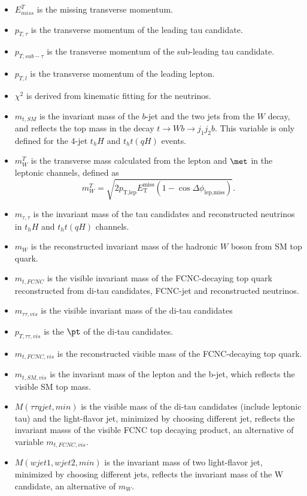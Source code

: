 \begin{itemize}
\item $E^{T}_{miss}$ is the missing transverse momentum.
\item $p_{T,\tau}$ is the transverse momentum of the leading tau candidate.
\item $p_{T,sub-\tau}$ is the transverse momentum of the sub-leading tau candidate.
\item $p_{T,l}$ is the transverse momentum of the leading lepton.
\item $\chi^2$ is derived from kinematic fitting for the neutrinos.
\item $m_{t,SM}$ is the invariant mass of the $b$-jet and the two jets from the $W$ decay, and reflects the top mass in the decay $t\to Wb \to j_1j_2b$. This variable is only defined for the 4-jet $t_hH$ and $t_ht(qH)$ events.
\item $m^{T}_{W}$ is the transverse mass calculated from the lepton and $\met$ in the leptonic channels, defined as
\begin{equation}
m^{T}_{W} = \sqrt{2 p_{\text{T,lep}} E_{\text{T}}^{\text{miss}} \left(1-\cos\Delta\phi_{\text{lep,miss}} \right)}.  
\end{equation}
\item $m_{\tau,\tau}$ is the invariant mass of the tau candidates and reconstructed neutrinos in $t_hH$ and $t_ht(qH)$ channels. 
\item $m_{W}$ is the reconstructed invariant mass of the hadronic $W$ boson from SM top quark.
\item $m_{t,FCNC}$ is the visible invariant mass of the FCNC-decaying top quark reconstructed from di-tau candidates, FCNC-jet and reconstructed neutrinos.
\item $m_{\tau\tau,vis}$ is the visible invariant mass of the di-tau candidates
\item $p_{T,\tau\tau,vis}$ is the $\pt$ of the di-tau candidates.
\item $m_{t,FCNC,vis}$ is the reconstructed visible mass of the FCNC-decaying top quark.
\item $m_{t,SM,vis}$ is the invariant mass of the lepton and the b-jet, which reflects the visible SM top mass.
\item $M(\tau\tau qjet,min)$ is the visible mass of the di-tau candidates (include leptonic tau) and the light-flavor jet, minimized by choosing different jet, reflects the invariant masss of the visible FCNC top decaying product, an alternative of variable $m_{t,FCNC,vis}$.
\item $M(wjet1,wjet2,min)$ is the invariant mass of two light-flavor jet, minimized by choosing different jets, reflects the invariant mass of the W candidate, an alternative of $m_{W}$.

\end{itemize}
